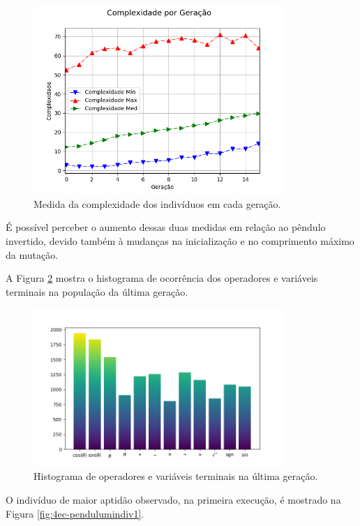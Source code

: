 \begin{figure}[H]
	\centering
	\includegraphics[width=0.85\textwidth]{02_desenvolvimento/04_EC_Fig_PendulumCompl.png}
	\caption{Medida da complexidade dos indivíduos em cada geração.}
	\label{fig:4ec-pendulumcompl}
\end{figure}

É possível perceber o aumento dessas duas medidas em relação ao pêndulo invertido, devido também à mudanças na inicialização e no comprimento máximo da mutação. 

A Figura \ref{fig:4ec-pendulumoper} mostra o histograma de ocorrência dos operadores e variáveis terminais na população da última geração. 

\begin{figure}[H]
	\centering
	\includegraphics[width=0.85\textwidth]{02_desenvolvimento/04_EC_Fig_PendulumOper.png}
	\caption{Histograma de operadores e variáveis terminais na última geração.}
	\label{fig:4ec-pendulumoper}
\end{figure}

O indivíduo de maior aptidão observado, na primeira execução, é mostrado na Figura \ref{fig:4ec-pendulumindiv1}.

